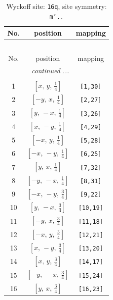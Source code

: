 \documentclass[fleqn,8pt]{jsarticle}
\begin{document}
\begin{longtable}{ccc}
\caption{Wyckoff site: {\tt 16q}, site symmetry: {\tt m'..}}
 \\
 \hline \hline
No. & position & mapping \\ \hline \endfirsthead

\multicolumn{2}{l}{\tablename\ \thetable{}} \\
 \hline \hline
No. & position & mapping \\ \hline \endhead

 \hline \hline
\multicolumn{2}{r}{\footnotesize\it continued ...} \\ \endfoot

 \hline \hline
\multicolumn{2}{r}{} \\ \endlastfoot

1 & $\left[ x,\, y,\, \frac{1}{4} \right]$ & {\tt [1,30]} \\ \hline
2 & $\left[ - y,\, x,\, \frac{1}{4} \right]$ & {\tt [2,27]} \\ \hline
3 & $\left[ y,\, - x,\, \frac{1}{4} \right]$ & {\tt [3,26]} \\ \hline
4 & $\left[ x,\, - y,\, \frac{1}{4} \right]$ & {\tt [4,29]} \\ \hline
5 & $\left[ - x,\, y,\, \frac{1}{4} \right]$ & {\tt [5,28]} \\ \hline
6 & $\left[ - x,\, - y,\, \frac{1}{4} \right]$ & {\tt [6,25]} \\ \hline
7 & $\left[ y,\, x,\, \frac{1}{4} \right]$ & {\tt [7,32]} \\ \hline
8 & $\left[ - y,\, - x,\, \frac{1}{4} \right]$ & {\tt [8,31]} \\ \hline
9 & $\left[ - x,\, - y,\, \frac{3}{4} \right]$ & {\tt [9,22]} \\ \hline
10 & $\left[ y,\, - x,\, \frac{3}{4} \right]$ & {\tt [10,19]} \\ \hline
11 & $\left[ - y,\, x,\, \frac{3}{4} \right]$ & {\tt [11,18]} \\ \hline
12 & $\left[ - x,\, y,\, \frac{3}{4} \right]$ & {\tt [12,21]} \\ \hline
13 & $\left[ x,\, - y,\, \frac{3}{4} \right]$ & {\tt [13,20]} \\ \hline
14 & $\left[ x,\, y,\, \frac{3}{4} \right]$ & {\tt [14,17]} \\ \hline
15 & $\left[ - y,\, - x,\, \frac{3}{4} \right]$ & {\tt [15,24]} \\ \hline
16 & $\left[ y,\, x,\, \frac{3}{4} \right]$ & {\tt [16,23]} \\
\end{longtable}
\end{document}
